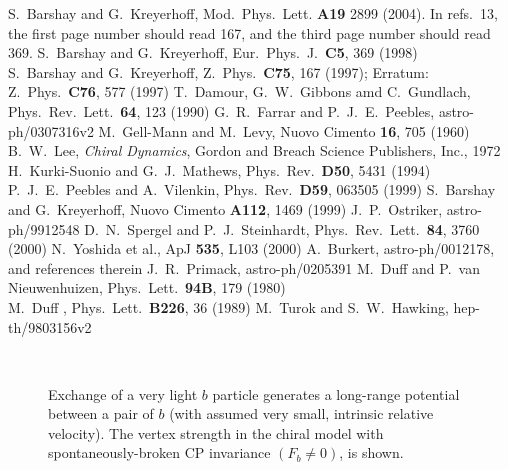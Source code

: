 \begin{thebibliography}{9}
 S.~Barshay and G.~Kreyerhoff, Mod.~Phys.~Lett. {\bf A19} 2899 (2004). In refs.~13, the
first page number should read 167, and the third page number should read 369.
 S.~Barshay and G.~Kreyerhoff, Eur.~Phys.~J.~{\bf C5}, 369 (1998)\\
	       S.~Barshay and G.~Kreyerhoff, Z.~Phys.~{\bf C75}, 167 (1997); Erratum: Z.~Phys.~{\bf C76}, 577 (1997)
 T.~Damour, G.~W.~Gibbons amd C.~Gundlach, Phys.~Rev.~Lett.~{\bf 64}, 123 (1990)
 G.~R.~Farrar and P.~J.~E.~Peebles, astro-ph/0307316v2
 M.~Gell-Mann and M.~Levy, Nuovo Cimento {\bf 16}, 705 (1960)
  B.~W.~Lee, {\it Chiral Dynamics}, Gordon and Breach Science Publishers, Inc., 1972
 H.~Kurki-Suonio and G.~J.~Mathews, Phys.~Rev.~{\bf D50}, 5431 (1994)
 P.~J.~E.~Peebles and A.~Vilenkin, Phys.~Rev.~{\bf D59}, 063505 (1999)
  S.~Barshay and G.~Kreyerhoff, Nuovo Cimento {\bf A112}, 1469 (1999)
 J.~P.~Ostriker, astro-ph/9912548
 D.~N.~Spergel and P.~J.~Steinhardt, Phys.~Rev.~Lett.~{\bf 84}, 3760 (2000)
 N.~Yoshida et al., ApJ {\bf 535}, L103 (2000)
 A.~Burkert, astro-ph/0012178, and references therein
 J.~R.~Primack, astro-ph/0205391
 M.~Duff and P.~van Nieuwenhuizen, Phys.~Lett.~{\bf 94B}, 179 (1980)\\
 M.~Duff , Phys.~Lett.~{\bf B226}, 36 (1989)
 M.~Turok and S.~W.~Hawking, hep-th/9803156v2
\end{thebibliography}
\newpage
\begin{figure}[t]
\begin{center}
\mbox{\epsfysize 13cm }
\end{center}
\caption{
Exchange of a very light $b$ particle generates a long-range potential between a pair of $b$ (with assumed
very small, intrinsic relative velocity). The vertex strength in the chiral model with spontaneously-broken
CP invariance $(F_b\neq 0)$, is shown.
}
\end{figure}














